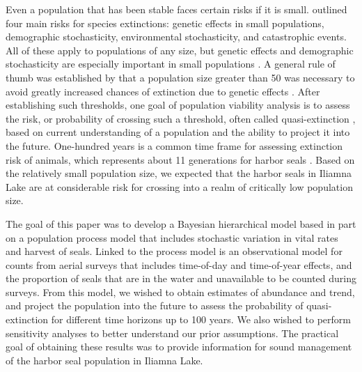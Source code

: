 \documentclass[12pt, titlepage]{article}\usepackage[]{graphicx}\usepackage[]{color}
\begin{document}
Even a population that has been stable faces certain risks if it is small. \citet{Shaf:mini:1981} outlined four main risks for species extinctions: genetic effects in small populations, demographic stochasticity, environmental stochasticity, and catastrophic events.  All of these apply to populations of any size, but genetic effects and demographic stochasticity are especially important in small populations \citep{Good:demo:1987}. A general rule of thumb was established by \citet{Fran:evol:1980} that a population size greater than 50 was necessary to avoid greatly increased chances of extinction due to genetic effects \citep[but see][for caveats]{Tayl:Roja:1999}.  After establishing such thresholds, one goal of population viability analysis is to assess the risk, or probability of crossing such a threshold, often called quasi-extinction \citep{Ginz:Slob:John:Bind:quas:1982}, based on current understanding of a population and the ability to project it into the future.  One-hundred years is a common time frame for assessing extinction risk of animals, which represents about 11 generations for harbor seals \citep{Swar:Reij:Pete:Van:abse:1996}. Based on the relatively small population size, we expected that the harbor seals in Iliamna Lake are at considerable risk for crossing into a realm of critically low population size.  

The goal of this paper was to develop a Bayesian hierarchical model based in part on a population process model that includes stochastic variation in vital rates and harvest of seals. Linked to the process model is an observational model for counts from aerial surveys that includes time-of-day and time-of-year effects, and the proportion of seals that are in the water and unavailable to be counted during surveys.  From this model, we wished to obtain estimates of abundance and trend, and project the population into the future to assess the probability of quasi-extinction for different time horizons up to 100 years.  We also wished to perform sensitivity analyses to better understand our prior assumptions. The practical goal of obtaining these results was to provide information for sound management of the harbor seal population in Iliamna Lake.

\end{document}
